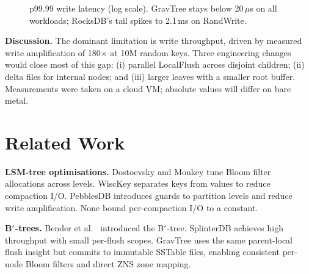 \documentclass{jors}
\begin{document}
\begin{figure}[t]
\centering
{}
\caption{p99.99 write latency (log scale). GravTree stays below
20\,$\mu$s on all workloads; RocksDB's tail spikes to 2.1\,ms on
RandWrite.}
\label{fig:p9999}
\end{figure}

\textbf{Discussion.} The dominant limitation is write throughput, driven
by measured write amplification of 180$\times$ at 10M random keys. Three
engineering changes would close most of this gap: (i) parallel LocalFlush
across disjoint children; (ii) delta files for internal nodes; and (iii)
larger leaves with a smaller root buffer. Measurements were taken on a
cloud VM; absolute values will differ on bare metal.

\section*{Related Work}

\textbf{LSM-tree optimisations.} Dostoevsky \citep{dostoevsky} and
Monkey \citep{monkey} tune Bloom filter allocations across levels.
WiscKey \citep{wisckey} separates keys from values to reduce compaction
I/O. PebblesDB \citep{pebblesdb} introduces guards to partition levels
and reduce write amplification. None bound per-compaction I/O to a
constant.

\textbf{B$^\varepsilon$-trees.} Bender et al.\ \citep{bender2007cache}
introduced the B$^\varepsilon$-tree. SplinterDB \citep{splinterdb}
achieves high throughput with small per-flush scopes. GravTree uses the
same parent-local flush insight but commits to immutable SSTable files,
enabling consistent per-node Bloom filters and direct ZNS zone mapping.
\end{document}
